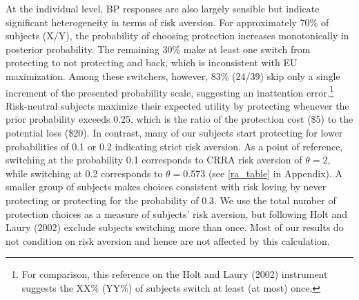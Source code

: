 At the individual level, BP responses are also largely sensible but  indicate significant heterogeneity in terms of risk aversion. For approximately 70\% of subjects (X/Y), the probability of choosing protection increases monotonically in posterior probability. The remaining 30\% make at least one switch from protecting to not protecting and back, which is inconsistent with EU maximization. Among these switchers, however, 83\% (24/39) skip only a single increment of the presented probability scale, suggesting an inattention error.\footnote{For comparison, this reference on the Holt and Laury (2002) instrument suggests the XX\% (YY\%) of subjects switch at least (at most) once.}  Risk-neutral subjects maximize their expected utility by protecting whenever the prior probability exceeds 0.25, which is the ratio of the protection cost (\$5) to the potential loss (\$20). In contrast, many of our subjects start protecting for lower probabilities of 0.1 or 0.2 indicating strict risk aversion. As a point of reference, switching at the probability 0.1 corresponds to CRRA risk aversion of $\theta=2$, while switching at 0.2 corresponds to $\theta=0.573$ (see \ref{ra_table} in Appendix).   A smaller group of subjects makes choices consistent with risk loving by never protecting or protecting for the probability of 0.3. We use the total number of protection choices as a measure of subjects' risk aversion, but following Holt and Laury (2002) exclude subjects switching more than once. Most of our results do not condition on risk aversion and hence are not affected by this calculation. 


